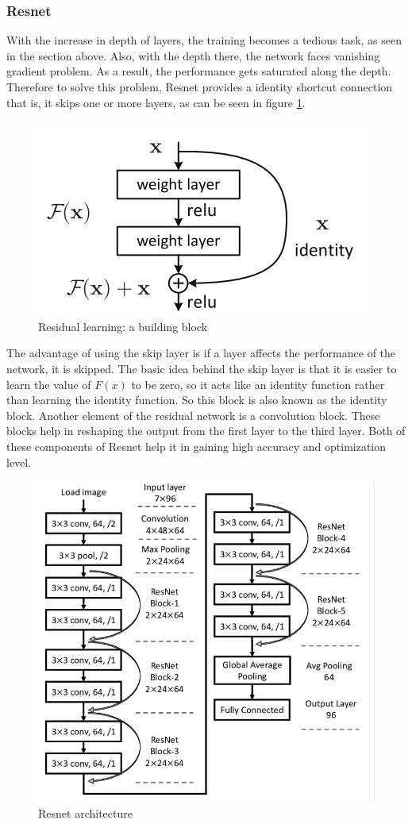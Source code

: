  \subsubsection{Resnet}
 With the increase in depth of layers, the training becomes a tedious task, as seen in the section above. Also, with the depth there, the network faces vanishing gradient problem. As a result, the performance gets saturated along the depth. Therefore to solve this problem, Resnet provides a identity shortcut connection that is, it skips one or more layers, as can be seen in figure \ref{ll}. 
      \begin{figure}[h]
      	\centering
      	\includegraphics[width=0.5\linewidth]{images/resd.png}
      	\caption{Residual learning: a building block \cite{he2016deep}}
      	\label{ll}	
      \end{figure}
     
            
The advantage of using the skip layer is if a layer affects the performance of the network, it is skipped. The basic idea behind the skip layer is that it is easier to learn the value of $F(x)$  to be zero, so it acts like an identity function rather than learning the identity function. So this block is also known as the identity block.
Another element of the residual network is a convolution block.  These blocks help in reshaping the output from the first layer to the third layer. Both of these components of Resnet help it in gaining high accuracy and optimization level. 

       \begin{figure}[h]
       	\centering
       	\includegraphics[width=0.5\linewidth]{images/rs.png}
       	\caption{Resnet architecture \cite{inproceedings}}
       	\label{ll1}	
       \end{figure}


